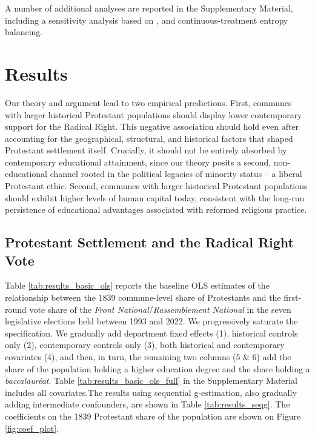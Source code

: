 \documentclass[12pt]{article}
\begin{document}
A number of additional analyses are reported in the Supplementary Material, including a sensitivity analysis based on \textcite{cinelli2020making}, and continuous-treatment entropy balancing.

\section{Results}

Our theory and argument lead to two empirical predictions. First, communes with larger historical Protestant populations should display lower contemporary support for the Radical Right. This negative association should hold even after accounting for the geographical, structural, and historical factors that shaped Protestant settlement itself. Crucially, it should not be entirely absorbed by contemporary educational attainment, since our theory posits a second, non-educational channel rooted in the political legacies of minority status -- a liberal Protestant ethic. Second, communes with larger historical Protestant populations should exhibit higher levels of human capital today, consistent with the long-run persistence of educational advantages associated with reformed religious practice. 

\subsection{Protestant Settlement and the Radical Right Vote}
Table \ref{tab:results_basic_ols} reports the baseline OLS estimates of the relationship between the 1839 commune-level share of Protestants and the first-round vote share of the \textit{Front National}/\textit{Rassemblement National} in the seven legislative elections held between 1993 and 2022. We progressively saturate the specification. We gradually add department fixed effects (1), historical controls only (2), contemporary controls only (3), both historical and contemporary covariates (4), and then, in turn, the remaining two columns (5 \& 6) add the share of the population holding a higher education degree and the share holding a \textit{baccalauréat}. Table \ref{tab:results_basic_ols_full} in the Supplementary Material includes all covariates.The results using sequential g-estimation, also gradually adding intermediate confounders, are shown in Table \ref{tab:results_seqg}. The coefficients on the 1839 Protestant share of the population are shown on Figure \ref{fig:coef_plot}.


\end{document}

